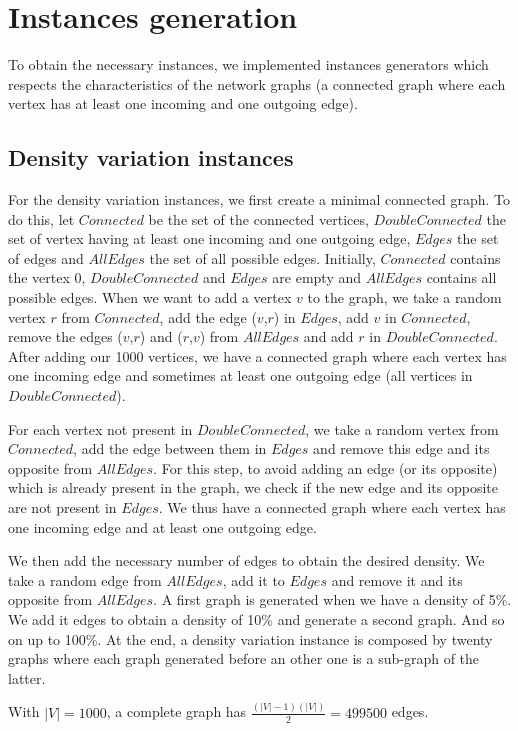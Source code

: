 \section{Instances generation}
To obtain the necessary instances, we implemented instances generators which respects the characteristics of the network graphs (a connected graph where each vertex has at least one incoming and one outgoing edge).

\subsection{Density variation instances}
For the density variation instances, we first create a minimal connected graph. To do this, let $Connected$ be the set of the connected vertices, $DoubleConnected$ the set of vertex having at least one incoming and one outgoing edge, $Edges$ the set of edges and $AllEdges$ the set of all possible edges. Initially, $Connected$ contains the vertex 0, $DoubleConnected$ and $Edges$ are empty and $AllEdges$ contains all possible edges. When we want to add a vertex $v$ to the graph, we take a random vertex $r$ from $Connected$, add the edge ($v$,$r$) in $Edges$, add $v$ in $Connected$, remove the edges ($v$,$r$) and ($r$,$v$) from $AllEdges$ and add $r$ in $DoubleConnected$. After adding our 1000 vertices, we have a connected graph where each vertex has one incoming edge and sometimes at least one outgoing edge (all vertices in $DoubleConnected$).

For each vertex not present in $DoubleConnected$, we take a random vertex from $Connected$, add the edge between them in $Edges$ and remove this edge and its opposite from $AllEdges$. For this step, to avoid adding an edge (or its opposite) which is already present in the graph, we check if the new edge and its opposite are not present in $Edges$. We thus have a connected graph where each vertex has one incoming edge and at least one outgoing edge.

We then add the necessary number of edges to obtain the desired density. We take a random edge from $AllEdges$, add it to $Edges$ and remove it and its opposite from $AllEdges$. A first graph is generated when we have a density of 5\%. We add it edges to obtain a density of 10\% and generate a second graph. And so on up to 100\%. At the end, a density variation instance is composed by twenty graphs where each graph generated before an other one is a sub-graph of the latter.

With $|V|=1000$, a complete graph has $\frac{(|V|-1)(|V|)}{2} = 499500$ edges.

